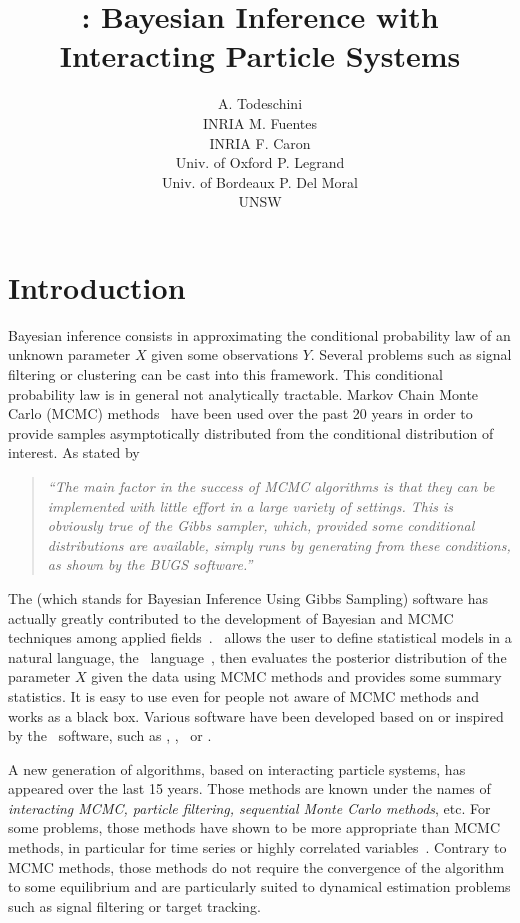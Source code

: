 \documentclass[article,shortnames]{jss}
\author{A. Todeschini\\INRIA\And
        M. Fuentes\\INRIA\And
        F. Caron\\Univ. of Oxford\And
        P. Legrand\\Univ. of Bordeaux\And
        P. Del Moral\\UNSW
        }
\title{\BiiPS: Bayesian Inference with Interacting Particle Systems}
\newcommand{\JAGS}{\pkg{JAGS}}
\newcommand{\BUGS}{\proglang{BUGS}}
\newcommand{\OpenBUGS}{\pkg{OpenBUGS}}
\newcommand{\WinBUGS}{\pkg{WinBUGS}}
\newcommand{\Stan}{\pkg{Stan}}
\begin{document}


\section{Introduction}
Bayesian inference consists in approximating the conditional probability law of an unknown parameter $X$ given some observations $Y$. Several problems such as signal filtering or clustering can be cast into this framework. This conditional probability law is in general not analytically tractable. Markov Chain Monte Carlo (MCMC) methods~\citep{Gilks1995,Robert2004} have been used over the past 20 years in order to provide samples asymptotically distributed from the conditional distribution of interest.
As stated by~\cite{Cappe2000}
\begin{quote}
\textit{``The main factor in the success of MCMC algorithms is that they can be implemented with little effort in a large variety of settings. This is obviously true of the Gibbs sampler, which, provided some conditional distributions are available, simply runs by generating from these conditions, as shown by the BUGS software.''}
\end{quote}

The \BUGS (which stands for Bayesian Inference Using Gibbs Sampling) software has actually greatly contributed to the development of Bayesian and MCMC techniques among applied fields~\citep{Lunn2012}. \BUGS\ allows the user to define statistical models in a natural language, the \BUGS\ language~\citep{Gilks1994}, then evaluates the posterior distribution of the parameter $X$ given the data using MCMC methods and provides some summary statistics. It is easy to use even for people not aware of MCMC methods and works as a black box. Various software have been developed based on or inspired by the \BUGS\ software, such as \WinBUGS, \OpenBUGS, \JAGS\ or \Stan.

A new generation of algorithms, based on interacting particle systems, has appeared over the last 15 years. Those methods are known under the names of \textit{interacting MCMC, particle filtering, sequential Monte Carlo methods}, etc. For some problems, those methods have shown to be more appropriate than MCMC methods, in particular for time series or highly correlated variables~\citep{Doucet2000,Doucet2001,Liu2001,DelMoral2004}. Contrary to MCMC methods, those methods do not require the convergence of the algorithm to some equilibrium and are particularly suited to dynamical estimation problems such as signal filtering or target tracking.
\end{document}
